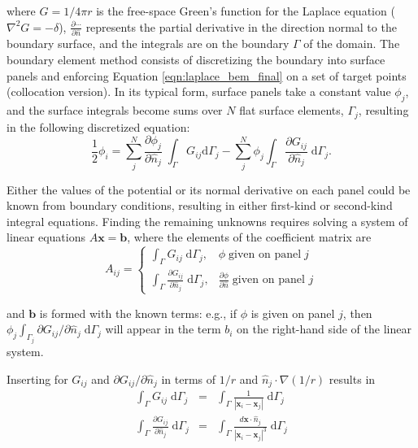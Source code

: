 \documentclass[final,leqno,]{siamltex1213}
\newcommand{\di}[1]{\text{d}#1}
\newcommand{\partiald}[2]{\frac{\partial #1}{\partial #2}}
\newcommand{\partialdi}[2]{\partial #1 / \partial #2}
\newcommand{\nhat}{\hat{n}}
\newcommand{\vect}[1]{\mathbf{#1}}
\begin{document}
\noindent where $G = 1/4\pi r$ is the free-space Green's function for the Laplace equation ($\nabla^{2}G = -\delta$),  $\partiald{\cdots}{\nhat}$ represents the partial derivative in the direction normal to the boundary surface, and the integrals are on the boundary $\Gamma$ of the domain. The boundary element method consists of discretizing the boundary into surface panels and enforcing Equation \eqref{eqn:laplace_bem_final} on a set of target points (collocation version). In its typical form, surface panels take a constant value $\phi_j$, and the surface integrals become sums over $N$ flat surface elements, $\Gamma_j$, resulting in the following discretized equation:
%
\begin{equation}
	\frac{1}{2}\phi_i = \sum_j^{N} \partiald{\phi_j}{\nhat_j}\;\int_{\Gamma}G_{ij}\di{\Gamma_j} - \sum_j^{N} \phi_j\int_{\Gamma}\partiald{G_{ij}}{\nhat_j}\;\di{\Gamma_j}.
\end{equation}

Either the values of the potential or its normal derivative on each panel could be known from boundary conditions, resulting in either first-kind or second-kind integral equations. Finding the remaining unknowns requires solving a system of linear equations $A\vect{x}=\vect{b}$, where the elements of the coefficient matrix are
%
\begin{equation} \label{eqn:laplace_matrix}
	A_{ij} = 
	\begin{cases}
		\int_{\Gamma} G_{ij}\;\di{\Gamma_j}, & \phi\;\text{given on panel}\;j \\
		\int_{\Gamma} \partiald{G_{ij}}{\nhat_j}\;\di{\Gamma_j}, & \partiald{\phi}{\nhat}\;\text{given on panel } j
	\end{cases}
\end{equation}

\noindent
and $\vect{b}$ is formed with the known terms: e.g., if $\phi$ is given on panel $j$, then $\phi_j\int_{\Gamma_j}\partialdi{G_{ij}}{\nhat_j}\;\di{\Gamma_j}$ will appear in the term $b_i$ on the right-hand side of the linear system.

Inserting for $G_{ij}$ and $\partialdi{G_{ij}}{\nhat_j}$ in terms of $1/r$ and $\nhat_j\cdot\nabla(1/r)$ results in
%
\begin{eqnarray}
	\label{eqn:laplace_bem_G}\int_{\Gamma} G_{ij}\;\di{\Gamma_j} & = & \int_{\Gamma} \frac{1}{|\vect{x}_i-\vect{x}_j|} \;\di{\Gamma_j} \\ 
	\label{eqn:laplace_bem_dGdn}\int_{\Gamma} \partiald{G_{ij}}{\nhat_j}\;\di{\Gamma_j} & = & \int_{\Gamma}\frac{d\vect{x}\cdot\nhat_j}{|\vect{x}_i-\vect{x}_j|^{3}}\;\di{\Gamma_j}
\end{eqnarray}
\end{document}
